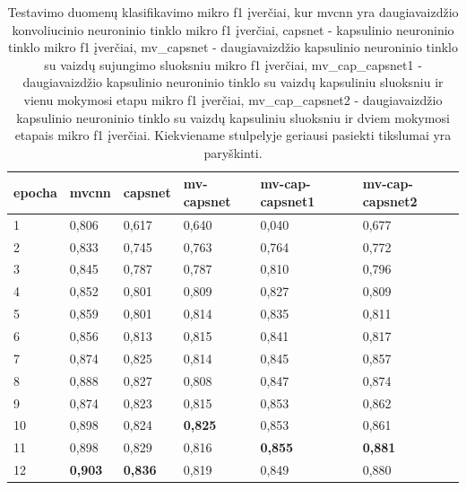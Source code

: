 \begin{table}[]
	\caption{
		Testavimo duomenų klasifikavimo mikro f1 įverčiai, kur mvcnn yra daugiavaizdžio konvoliucinio neuroninio tinklo mikro f1 įverčiai, capsnet - kapsulinio neuroninio tinklo mikro f1 įverčiai, mv\_capsnet - daugiavaizdžio kapsulinio neuroninio tinklo su vaizdų sujungimo sluoksniu mikro f1 įverčiai, mv\_cap\_capsnet1 - daugiavaizdžio kapsulinio neuroninio tinklo su vaizdų kapsuliniu sluoksniu ir vienu mokymosi etapu mikro f1 įverčiai, mv\_cap\_capsnet2 - daugiavaizdžio kapsulinio neuroninio tinklo su vaizdų kapsuliniu sluoksniu ir dviem mokymosi etapais mikro f1 įverčiai. Kiekviename stulpelyje geriausi pasiekti tikslumai yra paryškinti.
	}
	\begin{tabular}{l|l|l|l|l|l}
		epocha & mvcnn & capsnet & mv-capsnet & mv-cap-capsnet1 & mv-cap-capsnet2 \\
		\hline
		1 & 0,806 &   0,617 &      0,640 &           0,040 &           0,677 \\
		2 & 0,833 &   0,745 &      0,763 &           0,764 &           0,772 \\
		3 & 0,845 &   0,787 &      0,787 &           0,810 &           0,796 \\
		4 & 0,852 &   0,801 &      0,809 &           0,827 &           0,809 \\
		5 & 0,859 &   0,801 &      0,814 &           0,835 &           0,811 \\
		6 & 0,856 &   0,813 &      0,815 &           0,841 &           0,817 \\
		7 & 0,874 &   0,825 &      0,814 &           0,845 &           0,857 \\
		8 & 0,888 &   0,827 &      0,808 &           0,847 &           0,874 \\
		9 & 0,874 &   0,823 &      0,815 &           0,853 &           0,862 \\
		10 & 0,898 &   0,824 &      \textbf{0,825} &           0,853 &           0,861 \\
		11 & 0,898 &   0,829 &      0,816 &           \textbf{0,855} &           \textbf{0,881} \\
		12 & \textbf{0,903} &   \textbf{0,836} &      0,819 &           0,849 &           0,880 \\
	\end{tabular}
	\label{tbl:micro_f1}
\end{table}

